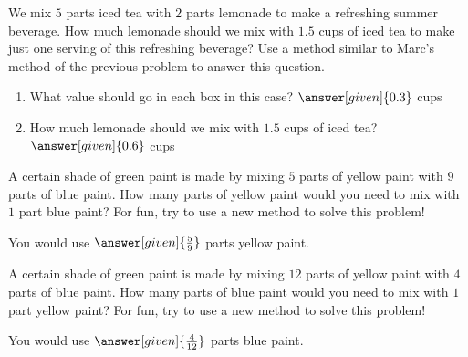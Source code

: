 \documentclass[nooutcomes]{ximera}
\begin{document}
\begin{problem}
We mix $5$ parts iced tea with $2$ parts lemonade to make a refreshing summer beverage.  How much lemonade should we mix with $1.5$ cups of iced tea to make just one serving of this refreshing beverage?  Use a method similar to Marc's method of the previous problem to answer this question.

\begin{center}

\begin{enumerate}
\item What value should go in each box in this case? $\answer[given]{0.3}$ cups
\item How much lemonade should we mix with $1.5$ cups of iced tea? $\answer[given]{0.6}$ cups
\end{enumerate}
\end{center}



\end{problem}











\begin{problem}
A certain shade of green paint is made by mixing $5$ parts of yellow paint with $9$ parts of blue paint.  How many parts of yellow paint would you need to mix with $1$ part blue paint?  For fun, try to use a new method to solve this problem!

\begin{prompt}
You would use $\answer[given]{\frac{5}{9}}$ parts yellow paint.
\end{prompt}
\end{problem}


\begin{problem}
A certain shade of green paint is made by mixing $12$ parts of yellow paint with $4$ parts of blue paint.  How many parts of blue paint would you need to mix with $1$ part yellow paint?  For fun, try to use a new method to solve this problem!

\begin{prompt}
You would use $\answer[given]{\frac{4}{12}}$ parts blue paint.
\end{prompt}
\end{problem}
\end{document}
